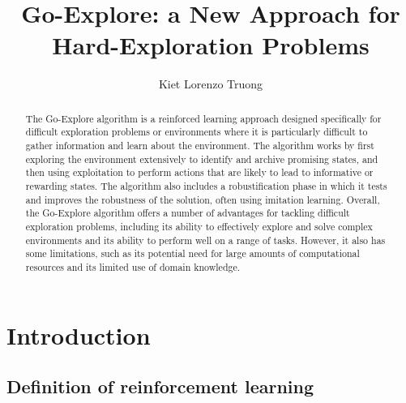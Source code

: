 \documentclass[runningheads]{llncs}%
\begin{document}
%
\title{Go-Explore: a New Approach for Hard-Exploration Problems }
%
%
\author{ Kiet Lorenzo Truong}
%
%
%
\maketitle              %
%

\begin{abstract}
The Go-Explore algorithm is a reinforced learning approach designed specifically for difficult exploration problems or environments where it is particularly difficult to gather information and learn about the environment. The algorithm works by first exploring the environment extensively to identify and archive promising states, and then using exploitation to perform actions that are likely to lead to informative or rewarding states. The algorithm also includes a robustification phase in which it tests and improves the robustness of the solution, often using imitation learning. Overall, the Go-Explore algorithm offers a number of advantages for tackling difficult exploration problems, including its ability to effectively explore and solve complex environments and its ability to perform well on a range of tasks. However, it also has some limitations, such as its potential need for large amounts of computational resources and its limited use of domain knowledge.
\end{abstract}

\section{Introduction}
\subsection{Definition of reinforcement learning}
\end{document}
